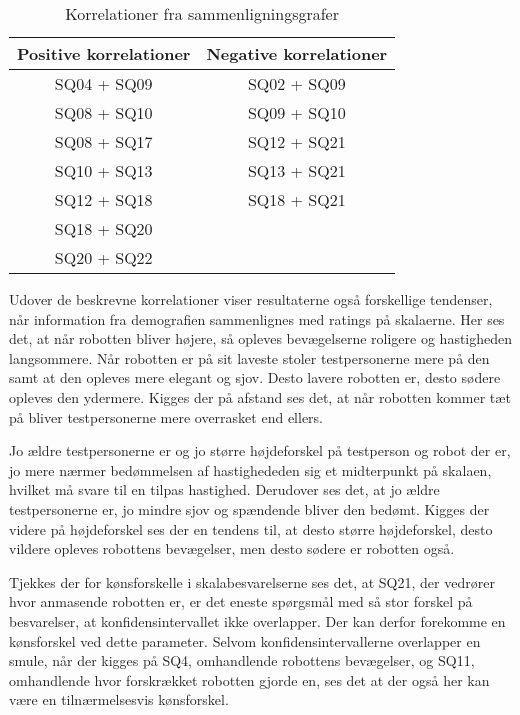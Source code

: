 \noindent
%
\begin{table}[H]
	\centering
	\begin{tabular}{ c|c }
		\centering
		Positive korrelationer & Negative korrelationer \\ \hline
		SQ04 + SQ09 & SQ02 + SQ09 \\ 
		SQ08 + SQ10 & SQ09 + SQ10 \\ 
		SQ08 + SQ17 & SQ12 + SQ21 \\ 
		SQ10 + SQ13 & SQ13 + SQ21 \\ 
		SQ12 + SQ18 & SQ18 + SQ21	\\	
		SQ18 + SQ20 & 							\\
		SQ20 + SQ22 & 
	\end{tabular}        
\caption{Korrelationer fra sammenligningsgrafer}
\label{tab:CorrelationsFromGraphs} 
\end{table}
\noindent
%
Udover de beskrevne korrelationer viser resultaterne også forskellige tendenser, når information fra demografien sammenlignes med ratings på skalaerne. Her ses det, at når robotten bliver højere, så opleves bevægelserne roligere og hastigheden langsommere. Når robotten er på sit laveste stoler testpersonerne mere på den samt at den opleves mere elegant og sjov. Desto lavere robotten er, desto sødere opleves den ydermere. Kigges der på afstand ses det, at når robotten kommer tæt på bliver testpersonerne mere overrasket end ellers. 

Jo ældre testpersonerne er og jo større højdeforskel på testperson og robot der er, jo mere nærmer bedømmelsen af hastighededen sig et midterpunkt på skalaen, hvilket må svare til en tilpas hastighed. Derudover ses det, at jo ældre testpersonerne er, jo mindre sjov og spændende bliver den bedømt. Kigges der videre på højdeforskel ses der en tendens til, at desto større højdeforskel, desto vildere opleves robottens bevægelser, men desto sødere er robotten også.

Tjekkes der for kønsforskelle i skalabesvarelserne ses det, at SQ21, der vedrører hvor anmasende robotten er, er det eneste spørgsmål med så stor forskel på besvarelser, at konfidensintervallet ikke overlapper. Der kan derfor forekomme en kønsforskel ved dette parameter. Selvom konfidensintervallerne overlapper en smule, når der kigges på SQ4, omhandlende robottens bevægelser, og SQ11, omhandlende hvor forskrækket robotten gjorde en, ses det at der også her kan være en tilnærmelsesvis kønsforskel.